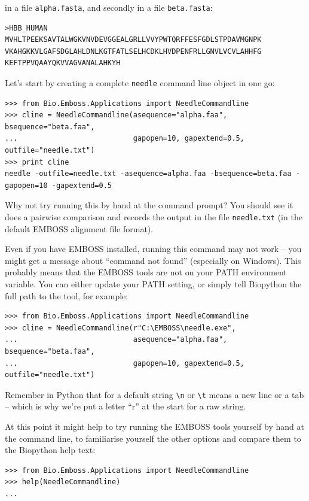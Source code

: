\documentclass{report}
\begin{document}
\noindent in a file \texttt{alpha.fasta}, and secondly in a file \texttt{beta.fasta}:

\begin{verbatim}
>HBB_HUMAN
MVHLTPEEKSAVTALWGKVNVDEVGGEALGRLLVVYPWTQRFFESFGDLSTPDAVMGNPK
VKAHGKKVLGAFSDGLAHLDNLKGTFATLSELHCDKLHVDPENFRLLGNVLVCVLAHHFG
KEFTPPVQAAYQKVVAGVANALAHKYH
\end{verbatim}

Let's start by creating a complete \texttt{needle} command line object in one go:

\begin{verbatim}
>>> from Bio.Emboss.Applications import NeedleCommandline
>>> cline = NeedleCommandline(asequence="alpha.faa", bsequence="beta.faa",
...                           gapopen=10, gapextend=0.5, outfile="needle.txt")
>>> print cline
needle -outfile=needle.txt -asequence=alpha.faa -bsequence=beta.faa -gapopen=10 -gapextend=0.5 
\end{verbatim}

Why not try running this by hand at the command prompt? You should see it does a
pairwise comparison and records the output in the file \texttt{needle.txt} (in the
default EMBOSS alignment file format).

Even if you have EMBOSS installed, running this command may not work -- you
might get a message about ``command not found'' (especially on Windows). This
probably means that the EMBOSS tools are not on your PATH environment
variable. You can either update your PATH setting, or simply tell Biopython
the full path to the tool, for example:

\begin{verbatim}
>>> from Bio.Emboss.Applications import NeedleCommandline
>>> cline = NeedleCommandline(r"C:\EMBOSS\needle.exe",
...                           asequence="alpha.faa", bsequence="beta.faa",
...                           gapopen=10, gapextend=0.5, outfile="needle.txt")
\end{verbatim}

\noindent Remember in Python that for a default string \verb|\n| or \verb|\t| means a
new line or a tab -- which is why we're put a letter ``r'' at the start for a raw string.

At this point it might help to try running the EMBOSS tools yourself by hand at the
command line, to familiarise yourself the other options and compare them to the
Biopython help text:

\begin{verbatim}
>>> from Bio.Emboss.Applications import NeedleCommandline
>>> help(NeedleCommandline)
...
\end{verbatim}
\end{document}
